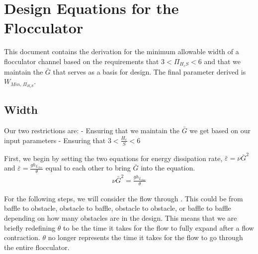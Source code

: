 \documentclass[letterpaper,10pt,english]{sphinxmanual}
\begin{document}
\section{Design Equations for the Flocculator}
\label{\detokenize{Flocculation/Floc_Derivations:design-equations-for-the-flocculator}}\label{\detokenize{Flocculation/Floc_Derivations:heading-design-equations-for-the-flocculator}}
This document contains the derivation for the minimum allowable width of
a flocculator channel based on the requirements that
\(3 < \Pi_{H_eS} < 6\) and that we maintain the \(\bar G\) that
serves as a basis for design. The final parameter derived is
\(W_{Min, \, \Pi_{H_eS}}\).


\subsection{Width}
\label{\detokenize{Flocculation/Floc_Derivations:width}}
Our two restrictions are: - Ensuring that we maintain the \(\bar G\)
we get based on our input parameters - Ensuring that
\(3 < \frac{H_e}{S} < 6\)

First, we begin by setting the two equations for energy dissipation
rate, \(\bar \varepsilon = \nu \bar G^2\) and
\(\bar \varepsilon = \frac{g h_{L_{floc}}}{\theta}\) equal to each
other to bring \(\bar G\) into the equation.
\begin{equation}\label{equation:Flocculation/Floc_Derivations:Flocculation/Floc_Derivations:0}
\begin{split}\nu \bar G^2 = \frac{g h_{L_{floc}}}{\theta}\end{split}
\end{equation}

For the following steps, we will consider the flow through . This
could be from baffle to obstacle, obstacle to baffle, obstacle to
obstacle, or baffle to baffle depending on how many obstacles are in the
design. This means that we are briefly redefining \(\theta\) to be
the time it takes for the flow to fully expand after a flow contraction.
\(\theta\) no longer represents the time it takes for the flow to go
through the entire flocculator.
\end{document}
